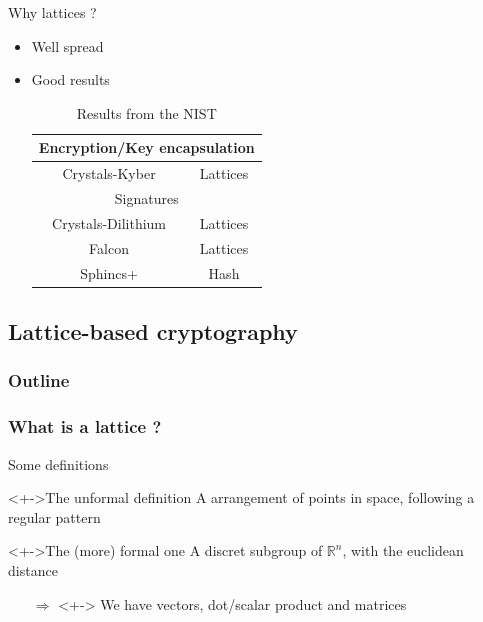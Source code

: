 \documentclass{beamer}
\begin{document}
\begin{frame}{Why lattices ?}
	\begin{itemize}
		\item Well spread
		\item Good results
			\begin{table}[h!]
			\begin{tabular}{|c|c|}
				\hline
				\multicolumn{2}{|c|}{Encryption/Key encapsulation} \\
				\hline
				Crystals-Kyber & Lattices \\
				\hline
				\multicolumn{2}{|c|}{Signatures} \\
				\hline
				Crystals-Dilithium & Lattices \\
				Falcon & Lattices \\
				Sphincs+ & Hash \\
				\hline
			\end{tabular}
			\center
			\caption{Results from the NIST}
			\end{table}
	\end{itemize}
\end{frame}

\subsection{Lattice-based cryptography}
\begin{frame}
  \frametitle{Outline}
\end{frame}

\subsubsection{What is a lattice ?}
\begin{frame}{Some definitions}
	\begin{block}<+->{The unformal definition}
		A arrangement of points in space, following a regular pattern
	\end{block}

	\begin{block}<+->{The (more) formal one}
		A discret subgroup of $\mathbb{R}^n$, with the euclidean distance
	\end{block}
	\begin{itemize}
		\item[$\Rightarrow$]<+-> We have vectors, dot/scalar product and matrices
	\end{itemize}
\end{frame}
\end{document}
